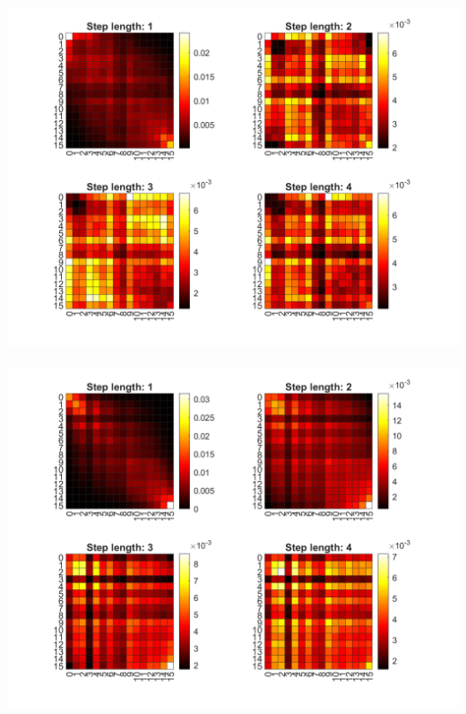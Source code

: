 \documentclass[12pt, letterpaper, twoside]{article}
\begin{document}
\ \\
\includegraphics[scale=0.4]{"glcm7.png"}
\ \\
\includegraphics[scale=0.4]{"glcm8.png"}
\ \\
\end{document}
